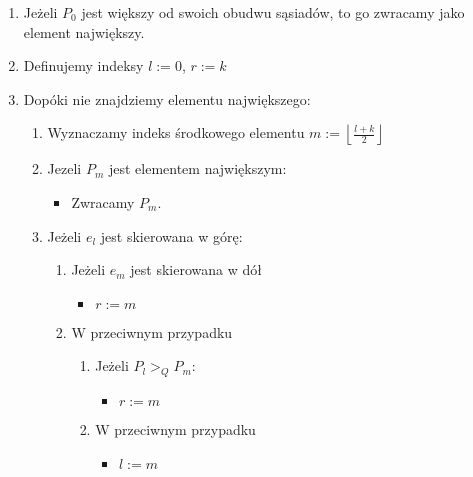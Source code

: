 \documentclass[11pt]{article}
\theoremstyle{remark} \newtheorem{definition}{def.}
\theoremstyle{definition} \newtheorem{twierdzenie}{tw.}
\begin{document}
        \begin{enumerate}
            \item   Jeżeli $P_0$ jest większy od swoich obudwu sąsiadów, to go zwracamy jako element
                    największy. 
            \item   Definujemy indeksy $l := 0$, $r := k$
            \item   Dopóki nie znajdziemy elementu największego:
                    \begin{enumerate}
                    \item   Wyznaczamy indeks środkowego elementu $m := \left\lfloor \frac{l + k}{2} \right\rfloor$
                    \item   Jezeli $P_m$ jest elementem największym:
                            \begin{itemize}
                                \item   Zwracamy $P_m$.
                            \end{itemize}
                    \item   Jeżeli $e_l$ jest skierowana w górę:
                            \begin{enumerate}
                                \item   Jeżeli $e_m$ jest skierowana w dół 
                                        \begin{itemize}
                                            \item $r := m$
                                        \end{itemize}
                                \item   W przeciwnym przypadku
                                        \begin{enumerate}
                                            \item   Jeżeli $P_l >_Q P_m$:
                                                    \begin{itemize}
                                                        \item $r := m$
                                                    \end{itemize}
                                            \item   W przeciwnym przypadku
                                                    \begin{itemize}
                                                        \item $l := m$

\end{itemize}
\end{enumerate}
\end{enumerate}
\end{enumerate}
\end{enumerate}
\end{document}
